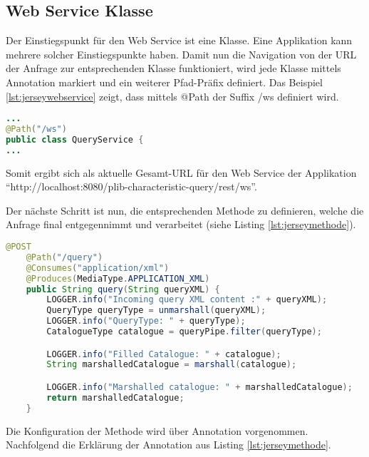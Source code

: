 \subsection{Web Service Klasse}
Der Einstiegspunkt für den \gls{Web Service} ist eine Klasse. Eine Applikation kann mehrere solcher Einstiegspunkte haben. Damit nun die Navigation von der URL der Anfrage zur entsprechenden Klasse funktioniert, wird jede Klasse mittels Annotation markiert und ein weiterer Pfad-Präfix definiert. Das Beispiel 
\ref{lst:jerseywebservice} zeigt, dass mittels @Path der Suffix /ws definiert wird. 
  \begin{lstlisting}[caption=Jersey Web Service Klasse, language=Java, label=lst:jerseywebservice]
...
@Path("/ws")
public class QueryService {
...
 \end{lstlisting}  
 
Somit ergibt sich als aktuelle Gesamt-URL für den Web Service der Applikation \\  \enquote{http://localhost:8080/plib-characteristic-query/rest/ws}.
 
Der nächste Schritt ist nun, die entsprechenden Methode zu definieren, welche die Anfrage final entgegennimmt und verarbeitet (siehe Listing \ref{lst:jerseymethode}). 
 
  \begin{lstlisting}[caption=Jersey Methode, language=Java, label=lst:jerseymethode]
    @POST
    @Path("/query")
    @Consumes("application/xml")
    @Produces(MediaType.APPLICATION_XML)
    public String query(String queryXML) {
        LOGGER.info("Incoming query XML content :" + queryXML);
        QueryType queryType = unmarshall(queryXML);
        LOGGER.info("QueryType: " + queryType);
        CatalogueType catalogue = queryPipe.filter(queryType);

        LOGGER.info("Filled Catalogue: " + catalogue);
        String marshalledCatalogue = marshall(catalogue);

        LOGGER.info("Marshalled catalogue: " + marshalledCatalogue);
        return marshalledCatalogue;
    }
 \end{lstlisting}  

Die Konfiguration der Methode wird über \Gls{Annotation} vorgenommen. Nachfolgend die Erklärung der \Gls{Annotation} aus Listing \ref{lst:jerseymethode}.

